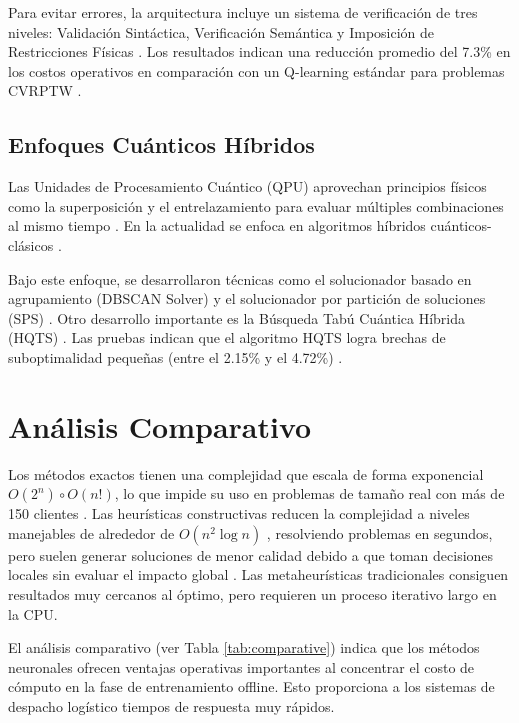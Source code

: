 \documentclass[a4paper, 11pt]{article}
\begin{document}
Para evitar errores, la arquitectura incluye un sistema de verificación de tres niveles: Validación Sintáctica, Verificación Semántica y Imposición de Restricciones Físicas \cite{ref1}. Los resultados indican una reducción promedio del 7.3\% en los costos operativos en comparación con un Q-learning estándar para problemas CVRPTW \cite{ref1}.

\subsection{Enfoques Cuánticos Híbridos}

Las Unidades de Procesamiento Cuántico (QPU) aprovechan principios físicos como la superposición y el entrelazamiento para evaluar múltiples combinaciones al mismo tiempo \cite{ref12}. En la actualidad se enfoca en algoritmos híbridos cuánticos-clásicos \cite{ref14}. 

Bajo este enfoque, se desarrollaron técnicas como el solucionador basado en agrupamiento (DBSCAN Solver) y el solucionador por partición de soluciones (SPS) \cite{ref14}. Otro desarrollo importante es la Búsqueda Tabú Cuántica Híbrida (HQTS) \cite{ref12}. Las pruebas indican que el algoritmo HQTS logra brechas de suboptimalidad pequeñas (entre el 2.15\% y el 4.72\%) \cite{ref13}.

\section{Análisis Comparativo}

Los métodos exactos tienen una complejidad que escala de forma exponencial $O(2^{n}) \circ O(n!)$, lo que impide su uso en problemas de tamaño real con más de 150 clientes \cite{ref1}. Las heurísticas constructivas reducen la complejidad a niveles manejables de alrededor de $O(n^{2}\log n)$ \cite{ref1}, resolviendo problemas en segundos, pero suelen generar soluciones de menor calidad debido a que toman decisiones locales sin evaluar el impacto global \cite{ref14}. Las metaheurísticas tradicionales consiguen resultados muy cercanos al óptimo, pero requieren un proceso iterativo largo en la CPU. 

El análisis comparativo (ver Tabla \ref{tab:comparative}) indica que los métodos neuronales ofrecen ventajas operativas importantes al concentrar el costo de cómputo en la fase de entrenamiento offline. Esto proporciona a los sistemas de despacho logístico tiempos de respuesta muy rápidos.
\end{document}
